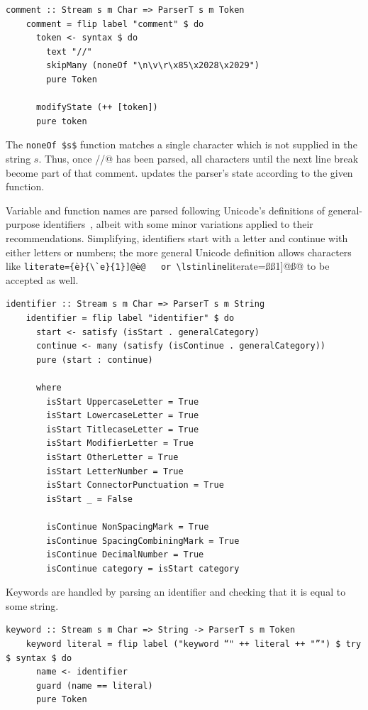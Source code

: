 \documentclass[UdineBachThesis,american,11pt]{PhdThesis}
\begin{document}
  \begin{lstlisting}[gobble=4,basicstyle=\ttfamily\small]
    comment :: Stream s m Char => ParserT s m Token
    comment = flip label "comment" $ do
      token <- syntax $ do
        text "//"
        skipMany (noneOf "\n\v\r\x85\x2028\x2029")
        pure Token

      modifyState (++ [token])
      pure token
  \end{lstlisting}

  The \lstinline[mathescape]@noneOf $s$@ function matches a single character
  which is not supplied in the string $s$. Thus, once \lstinline@//@ has been
  parsed, all characters until the next line break become part of that comment.
  \lstinline@modifyState@ updates the parser's state according to the given
  function.

  Variable and function names are parsed following Unicode's definitions of
  general-purpose identifiers~\cite{identifier-syntax}, albeit with some minor
  variations applied to their recommendations. Simplifying, identifiers start
  with a letter and continue with either letters or numbers; the more general
  Unicode definition allows characters like \lstinline[literate={è}{\`e}{1}]@è@
  or \lstinline[literate={ß}{\ss}{1}]@ß@ to be accepted as well.

  \begin{lstlisting}[gobble=4,basicstyle=\ttfamily\small]
    identifier :: Stream s m Char => ParserT s m String
    identifier = flip label "identifier" $ do
      start <- satisfy (isStart . generalCategory)
      continue <- many (satisfy (isContinue . generalCategory))
      pure (start : continue)

      where
        isStart UppercaseLetter = True
        isStart LowercaseLetter = True
        isStart TitlecaseLetter = True
        isStart ModifierLetter = True
        isStart OtherLetter = True
        isStart LetterNumber = True
        isStart ConnectorPunctuation = True
        isStart _ = False

        isContinue NonSpacingMark = True
        isContinue SpacingCombiningMark = True
        isContinue DecimalNumber = True
        isContinue category = isStart category
  \end{lstlisting}

  Keywords are handled by parsing an identifier and checking that it is equal to
  some string.

  \begin{lstlisting}[gobble=4,basicstyle=\ttfamily\small]
    keyword :: Stream s m Char => String -> ParserT s m Token
    keyword literal = flip label ("keyword “" ++ literal ++ "”") $ try $ syntax $ do
      name <- identifier
      guard (name == literal)
      pure Token
  \end{lstlisting}
\end{document}
